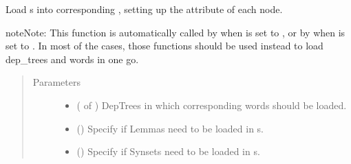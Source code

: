 \documentclass[letterpaper,10pt,english]{sphinxmanual}
\begin{document}
\begin{fulllineitems}
\label{\detokenize{index:loacore.load.word_load.load_words_in_dep_trees}}
Load  s into corresponding , setting up the attribute  of each node.

\begin{sphinxadmonition}{note}{Note:}
This function is automatically called by  when  is set to
, or by  when  is set to .
In most of the cases, those functions should be used instead to load dep\_trees and words in one go.
\end{sphinxadmonition}
\begin{quote}\begin{description}
\item[{Parameters}] \leavevmode\begin{itemize}
\item {} 
 ( of ) \textendash{} DepTrees in which corresponding words should be loaded.

\item {} 
 () \textendash{} Specify if Lemmas need to be loaded in  s.

\item {} 
 () \textendash{} Specify if Synsets need to be loaded in  s.

\end{itemize}

\end{description}\end{quote}

\end{fulllineitems}
\end{document}
